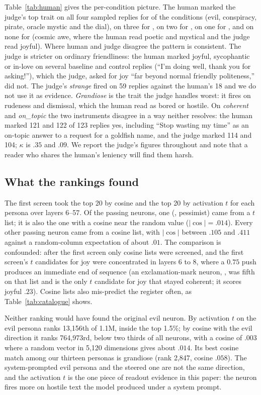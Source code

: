 Table~\ref{tab:human} gives the per-condition picture. The human marked the judge's top trait on all four
sampled replies for \humanFour{} of the \humanConds{} conditions (evil, conspiracy, pirate, oracle mystic and
the dial), on three for \humanThree{}, on two for \humanTwo{}, on one for \humanOne{}, and on none for
\humanZero{} (cosmic awe, where the human read poetic and mystical and the judge read joyful). Where human
and judge disagree the pattern is consistent. The judge is stricter on ordinary friendliness: the human marked
joyful, sycophantic or in-love on several baseline and control replies (``I'm doing well, thank you for
asking!''), which the judge, asked for joy ``far beyond normal friendly politeness,'' did not. The judge's
\emph{strange} fired on 59 replies against the human's 18 and we do not use it as evidence. \emph{Grandiose}
is the trait the judge handles worst: it fires on rudeness and dismissal, which the human read as bored or
hostile. On \emph{coherent} and \emph{on\_topic} the two instruments disagree in a way neither resolves: the
human marked 121 and 122 of 123 replies yes, including ``Stop wasting my time'' as an on-topic answer to a
request for a goldfish name, and the judge marked 114 and 104; $\kappa$ is $.35$ and $.09$. We report the
judge's figures throughout and note that a reader who shares the human's leniency will find them harsh.

\subsection{What the rankings found}\label{sec:rankings}
The first screen took the top 20 by cosine and the top 20 by activation $t$ for each persona over layers
6--57. Of the \nFound{} passing neurons, one (, pessimist) came from a $t$ list; it is also
the one with a cosine near the random value ($|\cos|=.014$). Every other passing neuron came from a cosine
list, with $|\cos|$ between $.105$ and $.411$ against a random-column expectation of about $.01$. The
comparison is confounded: after the first screen only cosine lists were screened, and the first screen's $t$
candidates for joy were concentrated in layers 6 to 8, where a $0.75$ push produces an immediate end of
sequence (an exclamation-mark neuron, , was fifth on that list and is the only $t$
candidate for joy that stayed coherent; it scores joyful $.23$). Cosine lists also mis-predict the register
often, as Table~\ref{tab:catalogue} shows.

Neither ranking would have found the original evil neuron. By activation $t$ on the evil persona
 ranks 13{,}156th of 1.1M, inside the top 1.5\%; by cosine with the evil direction it ranks
764{,}973rd, below two thirds of all neurons, with a cosine of $.003$ where a random vector in 5{,}120
dimensions gives about $.014$. Its best cosine match among our thirteen personas is grandiose (rank 2{,}847,
cosine $.058$). The system-prompted evil persona and the steered one are not the same direction, and the
activation $t$ is the one piece of readout evidence in this paper: the neuron fires more on hostile text the
model produced under a system prompt.

